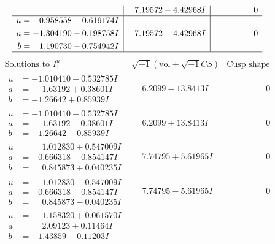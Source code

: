 \documentclass[1p]{elsarticle_modified}
\theoremstyle{definition}
\newcommand{\I}{\sqrt{-1}}
\begin{document}
$$\begin{array}{c|c|c}
 & \phantom{-}7.19572 - 4.42968 I & \phantom{-0.000000 } 0 \\ \hline\begin{aligned}
u &= -0.958558 - 0.619174 I \\
a &= -1.304190 + 0.198758 I \\
b &= \phantom{-}1.190730 + 0.754942 I\end{aligned}
 & \phantom{-}7.19572 + 4.42968 I & \phantom{-0.000000 } 0\\
 \hline 
 \end{array}$$\newpage$$\begin{array}{c|c|c}  
\text{Solutions to }I^u_{1}& \I (\text{vol} + \sqrt{-1}CS) & \text{Cusp shape}\\
 \hline 
\begin{aligned}
u &= -1.010410 + 0.532785 I \\
a &= \phantom{-}1.63192 + 0.38601 I \\
b &= -1.26642 + 0.85939 I\end{aligned}
 & \phantom{-}6.2099 - 13.8413 I & \phantom{-0.000000 } 0 \\ \hline\begin{aligned}
u &= -1.010410 - 0.532785 I \\
a &= \phantom{-}1.63192 - 0.38601 I \\
b &= -1.26642 - 0.85939 I\end{aligned}
 & \phantom{-}6.2099 + 13.8413 I & \phantom{-0.000000 } 0 \\ \hline\begin{aligned}
u &= \phantom{-}1.012830 + 0.547009 I \\
a &= -0.666318 + 0.854147 I \\
b &= \phantom{-}0.845873 + 0.040235 I\end{aligned}
 & \phantom{-}7.74795 + 5.61965 I & \phantom{-0.000000 } 0 \\ \hline\begin{aligned}
u &= \phantom{-}1.012830 - 0.547009 I \\
a &= -0.666318 - 0.854147 I \\
b &= \phantom{-}0.845873 - 0.040235 I\end{aligned}
 & \phantom{-}7.74795 - 5.61965 I & \phantom{-0.000000 } 0 \\ \hline\begin{aligned}
u &= \phantom{-}1.158320 + 0.061570 I \\
a &= \phantom{-}2.09123 + 0.11464 I \\
b &= -1.43859 - 0.11203 I\end{aligned}

\end{array}$$
\end{document}
